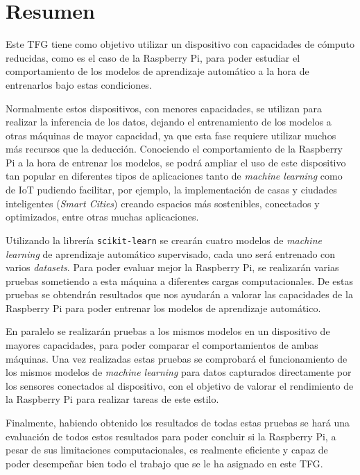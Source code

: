 \documentclass[a4paper, 12pt]{book}
\begin{document}

\chapter*{Resumen}

Este TFG tiene como objetivo utilizar un dispositivo con capacidades de cómputo reducidas, como es el caso de la Raspberry Pi, para poder estudiar el comportamiento de los modelos de aprendizaje automático a la hora de entrenarlos bajo estas condiciones. 

Normalmente estos dispositivos, con menores capacidades, se utilizan para realizar la inferencia de los datos, dejando el entrenamiento de los modelos a otras máquinas de mayor capacidad, ya que esta fase requiere utilizar muchos más recursos que la deducción. Conociendo el comportamiento de la Raspberry Pi a la hora de entrenar los modelos, se podrá ampliar el uso de este dispositivo tan popular en diferentes tipos de aplicaciones tanto de \textit{machine learning} como de IoT pudiendo facilitar, por ejemplo, la implementación de casas y ciudades inteligentes (\textit{Smart Cities}) creando espacios más sostenibles, conectados y optimizados, entre otras muchas aplicaciones.

Utilizando la librería \texttt{scikit-learn} se crearán cuatro modelos de \textit{machine learning} de aprendizaje automático supervisado, cada uno será entrenado con varios \textit{datasets}. Para poder evaluar mejor la Raspberry Pi, se realizarán varias pruebas sometiendo a esta máquina a diferentes cargas computacionales. De estas pruebas se obtendrán resultados que nos ayudarán a valorar las capacidades de la Raspberry Pi para poder entrenar los modelos de aprendizaje automático.

En paralelo se realizarán pruebas a los mismos modelos en un dispositivo de mayores capacidades, para poder comparar el comportamientos de ambas máquinas. Una vez realizadas estas pruebas se comprobará el funcionamiento de los mismos modelos de \textit{machine learning} para datos capturados directamente por los sensores conectados al dispositivo, con el objetivo de valorar el rendimiento de la Raspberry Pi para realizar tareas de este estilo.

Finalmente, habiendo obtenido los resultados de todas estas pruebas se hará una evaluación de todos estos resultados para poder concluir si la Raspberry Pi, a pesar de sus limitaciones computacionales, es realmente eficiente y capaz de poder desempeñar bien todo el trabajo que se le ha asignado en este TFG.
\end{document}
